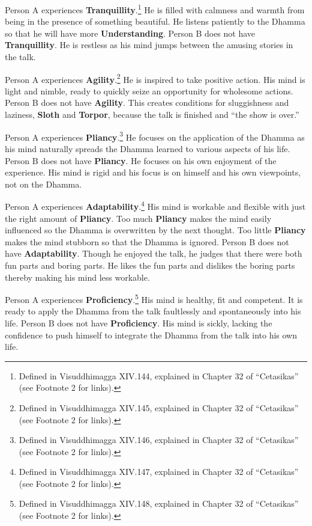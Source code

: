 Person A experiences \textbf{Tranquillity}.\footnote{Defined in Visuddhimagga XIV.144, explained in Chapter 32 of “Cetasikas” (see Footnote 2 for links).} He is filled with calmness and warmth from being in the presence of something beautiful. He listens patiently to the Dhamma so that he will have more \textbf{Understanding}. Person B does not have \textbf{Tranquillity}. He is restless as his mind jumps between the amusing stories in the talk.

Person A experiences \textbf{Agility}.\footnote{Defined in Visuddhimagga XIV.145, explained in Chapter 32 of “Cetasikas” (see Footnote 2 for links).} He is inspired to take positive action. His mind is light and nimble, ready to quickly seize an opportunity for wholesome actions. Person B does not have \textbf{Agility}. This creates conditions for sluggishness and laziness, \textbf{Sloth} and \textbf{Torpor}, because the talk is finished and “the show is over.”

Person A experiences \textbf{Pliancy}.\footnote{Defined in Visuddhimagga XIV.146, explained in Chapter 32 of “Cetasikas” (see Footnote 2 for links).} He focuses on the application of the Dhamma as his mind naturally spreads the Dhamma learned to various aspects of his life. Person B does not have \textbf{Pliancy}. He focuses on his own enjoyment of the experience. His mind is rigid and his focus is on himself and his own viewpoints, not on the Dhamma.

Person A experiences \textbf{Adaptability}.\footnote{Defined in Visuddhimagga XIV.147, explained in Chapter 32 of “Cetasikas” (see Footnote 2 for links).} His mind is workable and flexible with just the right amount of \textbf{Pliancy}. Too much \textbf{Pliancy} makes the mind easily influenced so the Dhamma is overwritten by the next thought. Too little \textbf{Pliancy} makes the mind stubborn so that the Dhamma is ignored. Person B does not have \textbf{Adaptability}. Though he enjoyed the talk, he judges that there were both fun parts and boring parts. He likes the fun parts and dislikes the boring parts thereby making his mind less workable.

Person A experiences \textbf{Proficiency}.\footnote{Defined in Visuddhimagga XIV.148, explained in Chapter 32 of “Cetasikas” (see Footnote 2 for links).} His mind is healthy, fit and competent. It is ready to apply the Dhamma from the talk faultlessly and spontaneously into his life. Person B does not have \textbf{Proficiency}. His mind is sickly, lacking the confidence to push himself to integrate the Dhamma from the talk into his own life.

